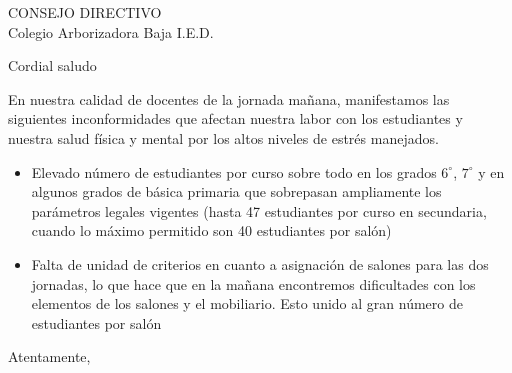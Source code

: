 \documentclass[letterpaper,spanish,11pt]{letter}
\begin{document}
\begin{letter}{CONSEJO DIRECTIVO\\Colegio Arborizadora Baja I.E.D.}
	
\opening{Cordial saludo}
En nuestra calidad de docentes de la jornada mañana, manifestamos las siguientes inconformidades que afectan nuestra labor con los estudiantes y nuestra salud física y mental por los altos niveles de estr\'{e}s manejados.
\begin{itemize}
\item Elevado n\'{u}mero de estudiantes por curso sobre todo en los grados $6^{\circ}$, $7^{\circ}$ y en algunos grados de básica primaria que sobrepasan ampliamente los par\'{a}metros legales vigentes (hasta 47 estudiantes por curso en secundaria, cuando lo m\'{a}ximo permitido son 40 estudiantes por sal\'{o}n)
\item Falta de unidad de criterios en cuanto a asignación de salones para las dos jornadas, lo que hace que en la mañana encontremos dificultades con los elementos de los salones y el mobiliario. Esto unido al gran n\'{u}mero de estudiantes por sal\'{o}n
\end{itemize}
\closing{Atentamente,}


\end{letter}
\end{document}
